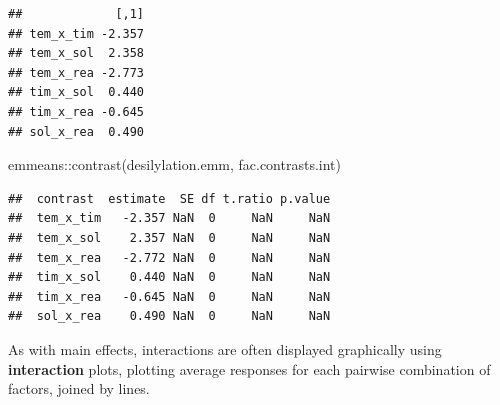 \documentclass[
]{book}
\newenvironment{Shaded}{\begin{snugshade}}{\end{snugshade}}
\newcommand{\FunctionTok}[1]{\textcolor[rgb]{0.00,0.00,0.00}{#1}}
\newcommand{\NormalTok}[1]{#1}
\newcommand{\SpecialCharTok}[1]{\textcolor[rgb]{0.00,0.00,0.00}{#1}}
\newcommand{\StringTok}[1]{\textcolor[rgb]{0.31,0.60,0.02}{#1}}
\theoremstyle{definition}
\theoremstyle{definition}
\theoremstyle{definition}
\theoremstyle{definition}
\theoremstyle{remark}
\begin{document}
\begin{verbatim}
##             [,1]
## tem_x_tim -2.357
## tem_x_sol  2.358
## tem_x_rea -2.773
## tim_x_sol  0.440
## tim_x_rea -0.645
## sol_x_rea  0.490
\end{verbatim}

\begin{Shaded}
\begin{Highlighting}[]
\NormalTok{emmeans}\SpecialCharTok{::}\FunctionTok{contrast}\NormalTok{(desilylation.emm, }\StringTok{\textquotesingle{}fac.contrasts.int\textquotesingle{}}\NormalTok{)}
\end{Highlighting}
\end{Shaded}

\begin{verbatim}
##  contrast  estimate  SE df t.ratio p.value
##  tem_x_tim   -2.357 NaN  0     NaN     NaN
##  tem_x_sol    2.357 NaN  0     NaN     NaN
##  tem_x_rea   -2.772 NaN  0     NaN     NaN
##  tim_x_sol    0.440 NaN  0     NaN     NaN
##  tim_x_rea   -0.645 NaN  0     NaN     NaN
##  sol_x_rea    0.490 NaN  0     NaN     NaN
\end{verbatim}

As with main effects, interactions are often displayed graphically using \textbf{interaction} plots, plotting average responses for each pairwise combination of factors, joined by lines.
\end{document}
